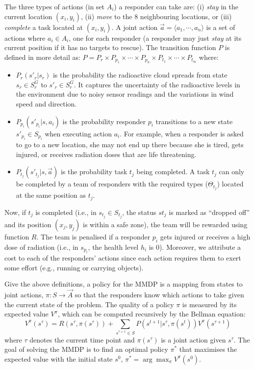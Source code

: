 The three types of actions  (in set $A_i$) a responder can take
are: (i) {\em stay} in the current location $(x_i, y_i)$, (ii) {\em
move} to the 8 neighbouring locations, or (iii) {\em complete} a
task located at $(x_i, y_i)$. A joint action $\vec{a}=\langle a_1,
\cdots, a_n \rangle$ is a set of actions where $a_i\in A_i$, one
for each responder (a responder may just \emph{stay} at its current
position if it has no targets to rescue). The transition function
$P$ is defined in more detail as: $P= P_r \times P_{p_1} \times
\cdots \times P_{p_n} \times P_{t_1} \times \cdots \times P_{t_m}$
where:
\begin{itemize}
    \itemsep=-2pt
    \item $P_r(s'_r|s_r)$ is the probability the radioactive
        cloud spreads from state $s_r\in S^G_r$ to $s'_r\in
        S^G_r$. It captures the uncertainty of the  radioactive
        levels in the environment due to  noisy sensor readings
        and the variations in wind speed and direction.
    \item $P_{p_i}(s'_{p_i}|s, a_i)$ is the probability
        responder $p_i$ transitions to a new state $s'_{p_i}\in
        S_{p_i}$ when executing action $a_i$. For example, when
        a responder is asked to go to a new location,  she
        may not end up there because  she is tired,
        gets injured, or receives radiation doses that are life
        threatening.
    \item $P_{t_j}(s'_{t_j}|s, \vec{a})$ is the probability
        task $t_j$ being completed. A task $t_j$ can only be completed by a
        team of responders with the required types ($\Theta_{t_j}$) located at the
        same position as $t_j$.
\end{itemize}

Now,  if  $t_j$ is completed (i.e., in $s_{t_j}\in S_{t_j}$, the
status $st_j$ is marked as ``dropped off'' and its position $(x_j,
y_j)$ is within a safe zone), the team will be rewarded using
function $R$. The team is penalised if a responder $p_i$ gets
injured or receives a high dose of radiation (i.e., in $s_{p_i}$,
the health level $h_i$ is 0). Moreover, we attribute a cost to each
of the responders' actions since  each  action requires them to
exert some effort (e.g., running or carrying objects).


Give the above definitions, a policy for the MMDP is a mapping from
states to joint actions, $\pi: S \rightarrow \vec{A}$ so that the
responders know which actions to take given the current state of
the problem. The quality of a policy $\pi$ is  measured by
its expected value $V^\pi$, which can be computed recursively by
the Bellman equation:
\begin{equation}
  V^\pi(s^\tau) = R(s^\tau, \pi(s^\tau)) + \!\!\!\sum_{s^{\tau+1}\in S}\!\!\!
  P(s^{t+1}|s^\tau, \pi(s^t)) V^\pi(s^{\tau+1})
\end{equation}
where $\tau$ denotes the current time point and $\pi(s^\tau)$ is a joint action given $s^\tau$. The goal of solving
the MMDP is to find an optimal policy $\pi^*$ that maximises the
expected value with the initial state $s^0$, $\pi^* =
\arg\max_{\pi} V^\pi(s^0)$.


